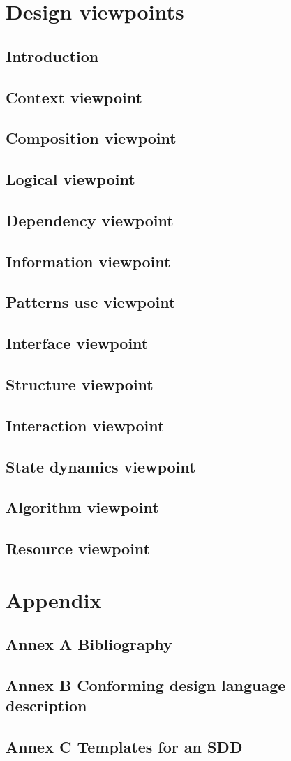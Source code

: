 \documentclass[compsoc,draftclsnofoot,onecolumn,10pt]{IEEEtran}
\begin{document}
\section{Design viewpoints}
\subsection{Introduction} 
\subsection{Context viewpoint} 
\subsection{Composition viewpoint} 
\subsection{Logical viewpoint} 
\subsection{Dependency viewpoint} 
\subsection{Information viewpoint} 
\subsection{Patterns use viewpoint} 
\subsection{Interface viewpoint} 
\subsection{Structure viewpoint} 
\subsection{Interaction viewpoint} 
\subsection{State dynamics viewpoint} 
\subsection{Algorithm viewpoint} 
\subsection{Resource viewpoint}

\section{Appendix}
\subsection{Annex A  Bibliography} 
\subsection{Annex B  Conforming design language description} 
\subsection{Annex C Templates for an SDD}
\end{document}

